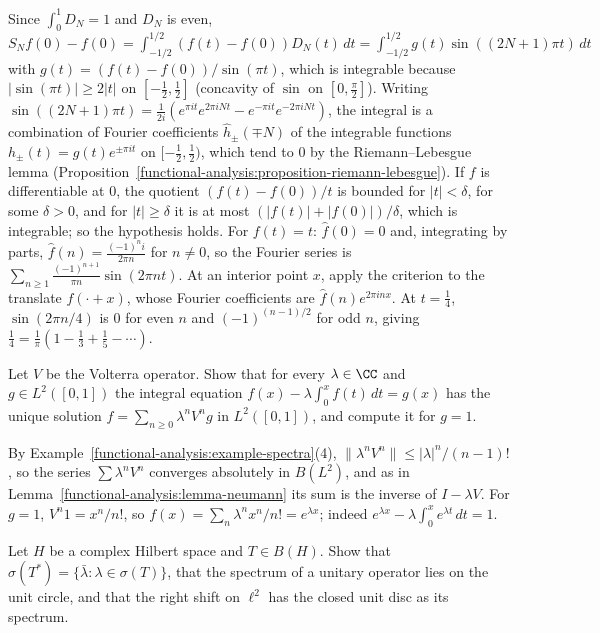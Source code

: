 \begin{solution}
Since $\int_0^1D_N = 1$ and $D_N$ is even, $S_Nf(0) - f(0) = \int_{-1/2}^{1/2}(f(t) - f(0))D_N(t)\,dt = \int_{-1/2}^{1/2}g(t)\sin((2N + 1)\pi t)\,dt$ with $g(t) = (f(t) - f(0))/\sin(\pi t)$, which is
integrable because $|\sin(\pi t)| \geq 2|t|$ on $[-\frac12, \frac12]$ (concavity of $\sin$ on $[0, \frac\pi2]$). Writing $\sin((2N + 1)\pi t) = \frac{1}{2i}(e^{\pi it}e^{2\pi iNt} - e^{-\pi it}e^{-2\pi iNt})$, the integral is a
combination of Fourier coefficients $\hat h_\pm(\mp N)$ of the integrable functions $h_\pm(t) = g(t)e^{\pm\pi it}$ on $[-\frac12, \frac12)$, which tend to $0$ by the Riemann--Lebesgue lemma
(Proposition~\ref{functional-analysis:proposition-riemann-lebesgue}). If $f$ is differentiable at $0$, the quotient $(f(t) - f(0))/t$ is bounded for $|t| < \delta$, for some $\delta > 0$, and for $|t| \geq \delta$ it is at most $(|f(t)| + |f(0)|)/\delta$, which is
integrable; so the hypothesis holds.
For $f(t) = t$: $\hat f(0) = 0$ and, integrating by parts, $\hat f(n) = \frac{(-1)^ni}{2\pi n}$ for $n \neq 0$, so the Fourier series is $\sum_{n \geq 1}\frac{(-1)^{n+1}}{\pi n}\sin(2\pi nt)$. At an interior point
$x$, apply the criterion to the translate $f(\cdot + x)$, whose Fourier coefficients are $\hat f(n)e^{2\pi inx}$. At $t = \frac14$, $\sin(2\pi n/4)$ is $0$ for even $n$ and $(-1)^{(n-1)/2}$ for odd $n$, giving
$\frac14 = \frac1\pi(1 - \frac13 + \frac15 - \cdots)$.
\end{solution}

\begin{exercise}\label{functional-analysis:exercise-volterra-equation}
Let $V$ be the Volterra operator. Show that for every $\lambda \in \CC$ and $g \in L^2([0, 1])$ the integral equation $f(x) - \lambda\int_0^xf(t)\,dt = g(x)$ has the unique solution
$f = \sum_{n \geq 0}\lambda^nV^ng$ in $L^2([0, 1])$, and compute it for $g = 1$.
\end{exercise}

\begin{solution}
By Example~\ref{functional-analysis:example-spectra}(4), $\|\lambda^nV^n\| \leq |\lambda|^n/(n - 1)!$, so the series $\sum\lambda^nV^n$ converges absolutely in $B(L^2)$, and as in Lemma~\ref{functional-analysis:lemma-neumann} its sum is
the inverse of $I - \lambda V$. For $g = 1$, $V^n1 = x^n/n!$, so $f(x) = \sum_n\lambda^nx^n/n! = e^{\lambda x}$; indeed $e^{\lambda x} - \lambda\int_0^xe^{\lambda t}\,dt = 1$.
\end{solution}

\begin{exercise}\label{functional-analysis:exercise-spectrum-adjoint}
Let $H$ be a complex Hilbert space and $T \in B(H)$. Show that $\sigma(T^*) = \{\bar\lambda : \lambda \in \sigma(T)\}$, that the spectrum of a unitary operator lies on the unit circle, and that the right
shift on $\ell^2$ has the closed unit disc as its spectrum.
\end{exercise}

